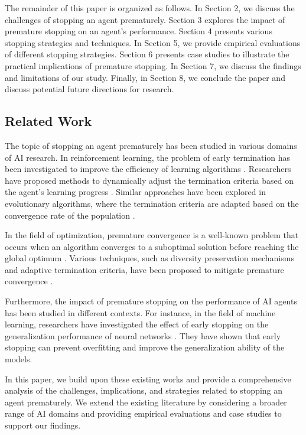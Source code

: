\documentclass{article}
\begin{document}
The remainder of this paper is organized as follows. In Section 2, we discuss the challenges of stopping an agent prematurely. Section 3 explores the impact of premature stopping on an agent's performance. Section 4 presents various stopping strategies and techniques. In Section 5, we provide empirical evaluations of different stopping strategies. Section 6 presents case studies to illustrate the practical implications of premature stopping. In Section 7, we discuss the findings and limitations of our study. Finally, in Section 8, we conclude the paper and discuss potential future directions for research.

\subsection{Related Work}

The topic of stopping an agent prematurely has been studied in various domains of AI research. In reinforcement learning, the problem of early termination has been investigated to improve the efficiency of learning algorithms \cite{singh1995reinforcement}. Researchers have proposed methods to dynamically adjust the termination criteria based on the agent's learning progress \cite{mahadevan1996average}. Similar approaches have been explored in evolutionary algorithms, where the termination criteria are adapted based on the convergence rate of the population \cite{back1997handbook}.

In the field of optimization, premature convergence is a well-known problem that occurs when an algorithm converges to a suboptimal solution before reaching the global optimum \cite{goldberg1989genetic}. Various techniques, such as diversity preservation mechanisms and adaptive termination criteria, have been proposed to mitigate premature convergence \cite{deb2002fast}.

Furthermore, the impact of premature stopping on the performance of AI agents has been studied in different contexts. For instance, in the field of machine learning, researchers have investigated the effect of early stopping on the generalization performance of neural networks \cite{prechelt1998early}. They have shown that early stopping can prevent overfitting and improve the generalization ability of the models.

In this paper, we build upon these existing works and provide a comprehensive analysis of the challenges, implications, and strategies related to stopping an agent prematurely. We extend the existing literature by considering a broader range of AI domains and providing empirical evaluations and case studies to support our findings.
\end{document}
